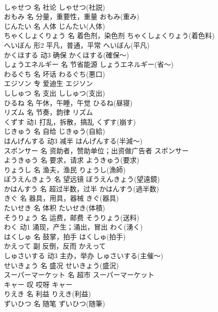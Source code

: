 \documentclass[8pt]{extreport}
\begin{document}
\begin{CJK}{UTF8}{min}
\\	しゃせつ	名	社论	しゃせつ(社説)	
\\	おもみ	名	分量，重要性，重量	おもみ(重み)	
\\	じんたい	名	人体	じんたい(人体)	
\\	ちゃくしょくりょう	名	着色剂，染色剂	ちゃくしょくりょう(着色料)	
\\	へいぼん	形2	平凡，普通，平常	へいぼん(平凡)	
\\	かくほする	动3	确保	かくほする(確保～)	
\\	しょうエネルギー	名	节省能源	しょうエネルギー(省～)	
\\	わるぐち	名	坏话	わるぐち(悪口)	
\\	エジソン	专	爱迪生	エジソン	
\\	ししゅつ	名	支出	ししゅつ(支出)	
\\	ひるね	名	午休，午睡，午觉	ひるね(昼寝)	
\\	リズム	名	节奏，韵律	リズム	
\\	くずす	动1	打乱，拆散，搞乱	くずす(崩す)	
\\	じきゅう	名	自给	じきゅう(自給)	
\\	はんげんする	动3	减半	はんげんする(半減～)	
\\	スポンサー	名	资助者，赞助单位；出资做广告者	スポンサー	
\\	ようきゅう	名	要求，请求	ようきゅう(要求)	
\\	りょうし	名	渔夫，渔民	りょうし(漁師)	
\\	ぼうえんきょう	名	望远镜	ぼうえんきょう(望遠鏡)	
\\	かはんすう	名	超过半数，过半	かはんすう(過半数)	
\\	きぐ	名	器具，用具，器械	きぐ(器具)	
\\	たいせき	名	体积	たいせき(体積)	
\\	そうりょう	名	运费，邮费	そうりょう(送料)	
\\	わく	动1	涌现，产生；涌出，冒出	わく(湧く)	
\\	はくしゅ	名	鼓掌，拍手	はくしゅ(拍手)	
\\	かえって	副	反倒，反而	かえって	
\\	しゅさいする	动3	主办，举办	しゅさいする(主催～)	
\\	せいきょう	名	盛况	せいきょう(盛況)	
\\	スーパーマーケット	名	超市	スーパーマーケット	
\\	キャー	叹	哎呀	キャー	
\\	りえき	名	利益	りえき(利益)	
\\	ずいひつ	名	随笔	ずいひつ(随筆)	

\end{CJK}
\end{document}
